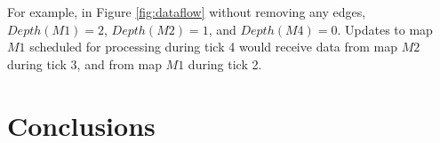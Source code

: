 \documentclass{sig-alternate}
\begin{document}
For example, in Figure \ref{fig:dataflow} without removing any edges, $Depth(M1) = 2$, $Depth(M2) = 1$, and $Depth(M4) = 0$.  Updates to map $M1$ scheduled for processing during tick 4 would receive data from map $M2$ during tick 3, and from map $M1$ during tick 2.

%
%
%
%
%
%

\section{Conclusions}
\label{sec:conclusions}







%
%
%
\end{document}
